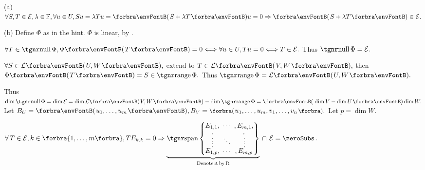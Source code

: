 \par\quad
(a) \,$\forall S,T\in\mathcal{E},\lambda\in\Fbb,\forall u\in U,Su=\lambda Tu=\Par{S+\lambda T}u=0\Rightarrow\Par{S+\lambda T}\in\mathcal{E}.$\par\quad
(b) Define $\Phi$ as in the hint. $\Phi$ is linear, by .\vspace{2pt}\par\quad\Hb
$\forall T\in\null\Phi,\Phi\Par{T}=0\Longleftrightarrow\forall u\in U,Tu=0\Longleftrightarrow T\in\mathcal{E}.$ Thus $\null\Phi=\mathcal{E}.$\par\quad\Hb
$\forall S\in\Lm{U,W},$ extend to $T\in\Lm{V,W},$ then $\Phi\Par{T}=S\in\range\Phi.$ Thus $\range\Phi=\Lm{U,W}.$\vspace{2pt}\par\quad\Hb
Thus $\dim\null\Phi=\dim\mathcal{E}=\dim\Lm{V,W}-\dim\range\Phi=\Par{\dim V-\dim U}\dim W.$\PfEnd\vspace{6pt}\quad\Hb
\Or Let $B_U=\Par{u_1,\dots,u_m},B_V=\BigPar{u_1,\dots,u_m,v_1,\dots,v_n}.$ Let $p=\dim W$. \par\vspace{2pt}\quad\Hb
$\forall \,T\in\mathcal{E},k\in\Bra{1,\dots,m},TE_{k,k}=0\Rightarrow{\normalsize\underbrace{\Spn\!\begin{Bmatrix} \underset{\;,}{E_{1,1}}, &\hspace{-6pt} \cdots &\hspace{-6pt} ,\underset{\!,}{E_{m,1}},\\[-2pt] \vdots &\hspace{-6pt} \ddots &\hspace{-6pt} \,\vdots\\[-2pt] \overset{\;,}{E_{1,p}}, &\hspace{-6pt} \cdots &\hspace{-6pt} ,\overset{\!\!,}{E_{m,p}}\end{Bmatrix}}_{\text{Denote\,it\,by\,R}}}\,\cap\,\mathcal{E}=\zeroSubs$.\vspace{-32pt}\par\Hb
